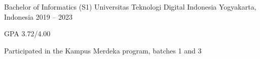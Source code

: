 

\begin{cventries}

  \cventry
    {Bachelor of Informatics (S1)} %
    {Universitas Teknologi Digital Indonesia} %
    {Yogyakarta, Indonesia} %
    {2019 -- 2023} %
    {
      \begin{cvitems} %
        \item {GPA 3.72/4.00}
        \item {Participated in the Kampus Merdeka program,
          batches 1 and 3}
      \end{cvitems}
    }
\end{cventries}
